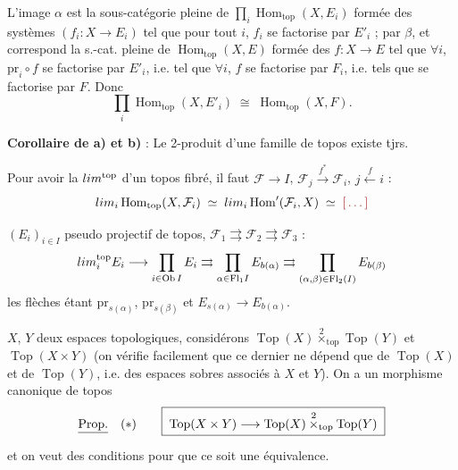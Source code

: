 \documentclass[11pt,a4paper]{article}
\begin{document}
L'image   $\alpha$ est la sous-catégorie
 pleine de $\prod_{i} \operatorname{Hom}_{\mathrm{top}}(X, E_{i})$
formée des systèmes $(f_{i} : X \to E_{i})$ tel que pour tout $i$, $f_{i}$ se
factorise par $E'_{i}$ ; \ill{} \struck{\ill{}} par $\beta$, et correspond
\ill{} la s.-cat. pleine de $\operatorname{Hom}_{\mathrm{top}}(X, E)$ formée des
$f : X \to E$ tel que $\forall i$, $\mathrm{pr}_{i} \circ f$ se factorise par
$E'_{i}$, i.e. tel que $\forall i$, $f$ se factorise par $F_{i}$, i.e. tels que
 se factorise par $F$. Donc
\[
\prod_{i} \operatorname{Hom}_{\mathrm{top}}(X, E'_{i}) \;\cong\;
\operatorname{Hom}_{\mathrm{top}}(X, F).
\]

\textbf{Corollaire de a) et b)} : Le 2-produit d'une famille de topos existe
tjrs.

Pour avoir la $\varprojlim^{\mathrm{top}}$ d'un topos fibré, il faut
$\mathcal{F} \to I$, $\mathcal{F}_{j} \xrightarrow{\ f^{*}\ } \mathcal{F}_{i}$,
$j \xleftarrow{\ f\ } i$ :
\[
\varprojlim_{i} \operatorname{Hom}_{\mathrm{top}}(X, \mathcal{F}_{i})
\;\simeq\;
\varprojlim_{i} \operatorname{Hom}'(\mathcal{F}_{i}, X)
\;\simeq\; \ill{}
\]

$(E_{i})_{i \in I}$ pseudo  projectif de topos,
$\mathcal{F}_{1} \rightrightarrows \mathcal{F}_{2} \rightrightarrows
\mathcal{F}_{3}$ :
\[
\varprojlim_{i}^{\mathrm{top}} E_{i} \longrightarrow
\prod_{i \in \operatorname{Ob} I} E_{i} \rightrightarrows
\prod_{\alpha \in \mathrm{Fl}_{1} I} E_{b(\alpha)} \rightrightarrows
\prod_{(\alpha,\beta) \in \mathrm{Fl}_{2}(I)} E_{b(\beta)}
\]
les flèches étant $\mathrm{pr}_{s(\alpha)}$, $\mathrm{pr}_{s(\beta)}$ et
$E_{s(\alpha)} \to E_{b(\alpha)}$.

$X$, $Y$ deux espaces topologiques, considérons $\operatorname{Top}(X)
\overset{2}{\times}_{\mathrm{top}} \operatorname{Top}(Y)$ et
$\operatorname{Top}(X \times Y)$ (on vérifie facilement que ce dernier ne
dépend que de $\operatorname{Top}(X)$ et de $\operatorname{Top}(Y)$, i.e. des
\struck{\ill{}} espaces sobres associés à $X$ et $Y$). On a un
morphisme canonique de topos
\[
\struck{\text{Prop.}} \quad (*) \qquad
\boxed{\;\operatorname{Top}(X \times Y) \longrightarrow \operatorname{Top}(X)
\overset{2}{\times}_{\mathrm{top}} \operatorname{Top}(Y)\;}
\]
et on veut des conditions pour que ce soit une équivalence.
\end{document}
